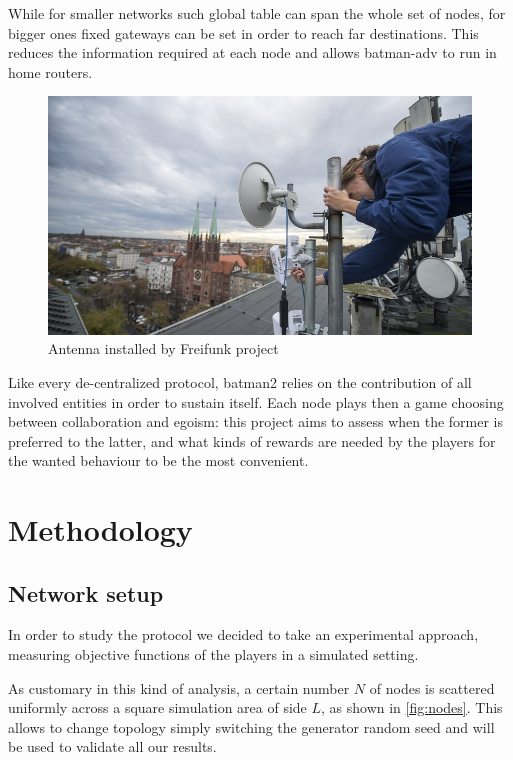 \documentclass[conference,10.5pt]{IEEEtran}
\begin{document}
While for smaller networks such global table can span the whole set of nodes, for bigger ones fixed gateways can be set in order to reach far destinations. This reduces the information required at each node and allows \gls{batman}-adv to run in home routers.

\begin{figure}[h]
  \centering
  \includegraphics[width=0.8\linewidth]{figures/batman_antenna}
  \caption{Antenna installed by Freifunk project}
  \label{fig:freifunk_img}
\end{figure}

\smallskip

Like every de-centralized protocol, \gls{batman2} relies on the contribution of all involved entities in order to sustain itself. Each node plays then a game choosing between collaboration and egoism: this project aims to assess when the former is preferred to the latter, and what kinds of rewards are needed by the players for the wanted behaviour to be the most convenient.

\section{Methodology}

\subsection{Network setup}

In order to study the protocol we decided to take an experimental approach, measuring objective functions of the players in a simulated setting.

As customary in this kind of analysis, a certain number $N$ of nodes is scattered uniformly across a square simulation area of side $L$, as shown in \autoref{fig:nodes}. This allows to change topology simply switching the generator random seed and will be used to validate all our results.
\end{document}
